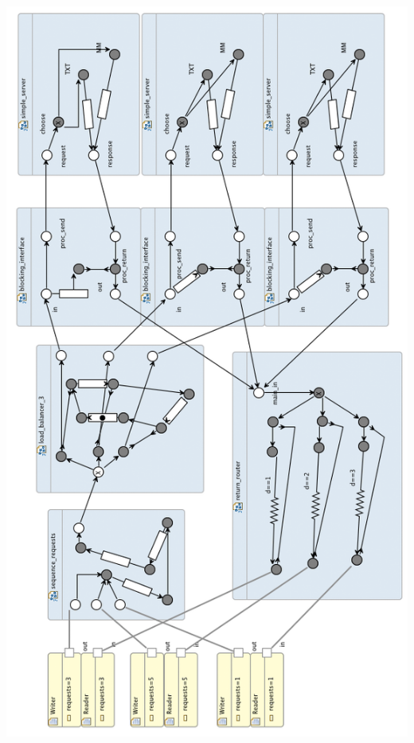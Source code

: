 \documentclass[a4paper]{article}
\begin{document}
    \begin{center}
        \includegraphics[height=0.95\textheight]{images/reo-full.png}
    \end{center}
\end{document}
